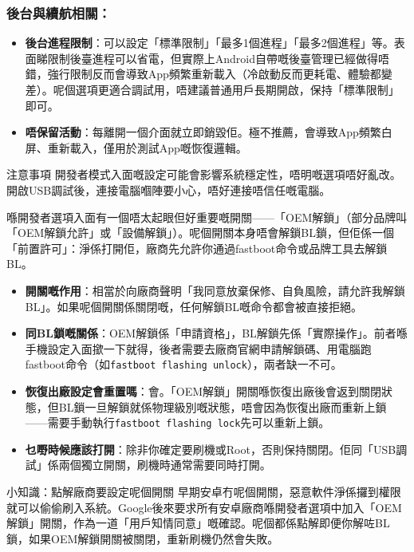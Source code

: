 \subsubsection*{後台與續航相關：}

\begin{itemize}
  \item \textbf{後台進程限制}：可以設定「標準限制」「最多1個進程」「最多2個進程」等。表面睇限制後臺進程可以省電，但實際上Android自帶嘅後臺管理已經做得唔錯，強行限制反而會導致App頻繁重新載入（冷啟動反而更耗電、體驗都變差）。呢個選項更適合調試用，唔建議普通用戶長期開啟，保持「標準限制」即可。
  \item \textbf{唔保留活動}：每離開一個介面就立即銷毀佢。極不推薦，會導致App頻繁白屏、重新載入，僅用於測試App嘅恢復邏輯。
\end{itemize}

\begin{tcbwarn}{注意事項}
開發者模式入面嘅設定可能會影響系統穩定性，唔明嘅選項唔好亂改。開啟USB調試後，連接電腦嗰陣要小心，唔好連接唔信任嘅電腦。

\end{tcbwarn}


喺開發者選項入面有一個唔太起眼但好重要嘅開關——「OEM解鎖」（部分品牌叫「OEM解鎖允許」或「設備解鎖」）。呢個開關本身唔會解鎖BL鎖，但佢係一個「前置許可」：淨係打開佢，廠商先允許你通過fastboot命令或品牌工具去解鎖BL。

\begin{itemize}
  \item \textbf{開關嘅作用}：相當於向廠商聲明「我同意放棄保修、自負風險，請允許我解鎖BL」。如果呢個開關係關閉嘅，任何解鎖BL嘅命令都會被直接拒絕。
  \item \textbf{同BL鎖嘅關係}：OEM解鎖係「申請資格」，BL解鎖先係「實際操作」。前者喺手機設定入面撳一下就得，後者需要去廠商官網申請解鎖碼、用電腦跑fastboot命令（如\texttt{fastboot flashing unlock}），兩者缺一不可。
  \item \textbf{恢復出廠設定會重置嗎}：會。「OEM解鎖」開關喺恢復出廠後會返到關閉狀態，但BL鎖一旦解鎖就係物理級別嘅狀態，唔會因為恢復出廠而重新上鎖——需要手動執行\texttt{fastboot flashing lock}先可以重新上鎖。
  \item \textbf{乜嘢時候應該打開}：除非你確定要刷機或Root，否則保持關閉。佢同「USB調試」係兩個獨立開關，刷機時通常需要同時打開。
\end{itemize}

\begin{tcbinfo}{小知識：點解廠商要設定呢個開關}
早期安卓冇呢個開關，惡意軟件淨係攞到權限就可以偷偷刷入系統。Google後來要求所有安卓廠商喺開發者選項中加入「OEM解鎖」開關，作為一道「用戶知情同意」嘅確認。呢個都係點解即便你解咗BL鎖，如果OEM解鎖開關被關閉，重新刷機仍然會失敗。

\end{tcbinfo}

